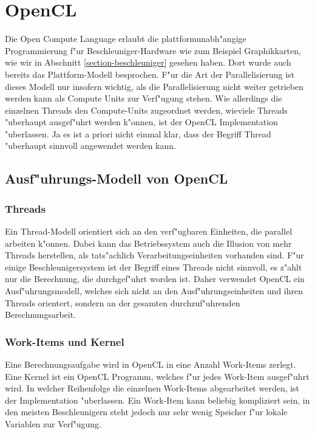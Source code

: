 \section{OpenCL\label{opencl-intro}}
Die Open Compute Language \cite{skript:opencl}
erlaubt die plattformunabh"angige Programmierung
f"ur Beschleuniger-Hardware wie zum Beispiel Graphikkarten, wie wir
in Abschnitt \ref{section-beschleuniger} gesehen haben. 
Dort wurde auch bereits das Plattform-Modell besprochen.
F"ur die Art der Parallelisierung ist dieses Modell nur insofern wichtig,
als die Parallelisierung nicht weiter getrieben werden kann als Compute
Units zur Verf"ugung stehen.
Wie allerdings die einzelnen Threads den Compute-Units zugeordnet werden,
wieviele Threads "uberhaupt ausgef"uhrt werden k"onnen, ist der
OpenCL Implementation "uberlassen.
Ja es ist a priori nicht einmal klar, dass der Begriff Thread "uberhaupt
sinnvoll angewendet werden kann.

\subsection{Ausf"uhrungs-Modell von OpenCL}
\subsubsection{Threads}
Ein Thread-Modell orientiert sich an den verf"ugbaren Einheiten, die
parallel arbeiten k"onnen.
Dabei kann das Betriebssystem auch die Illusion von mehr Threads
herstellen, als tats"achlich Verarbeitungseinheiten vorhanden sind.
F"ur einige Beschleunigersystem ist der Begriff eines Threads nicht
sinnvoll, es z"ahlt nur die Berechnung, die durchgef"uhrt worden ist.
Daher verwendet OpenCL ein Ausf"uhrungsmodell, welches sich nicht
an den Ausf"uhrungseinheiten und ihren Threads orientert, sondern an
der gesamten durchzuf"uhrenden Berechnungsarbeit.

\subsubsection{Work-Items und Kernel}
Eine Berechnungsaufgabe wird in OpenCL in eine Anzahl Work-Items
zerlegt.
Eine Kernel ist ein OpenCL Programm, welches f"ur jedes Work-Item
ausgef"uhrt wird.
In welcher Reihenfolge die einzelnen Work-Items abgearbeitet werden,
ist der Implementation "uberlassen.
Ein Work-Item kann beliebig kompliziert sein, in den meisten Beschleunigern
steht jedoch nur sehr wenig Speicher f"ur lokale Variablen zur Verf"ugung.

